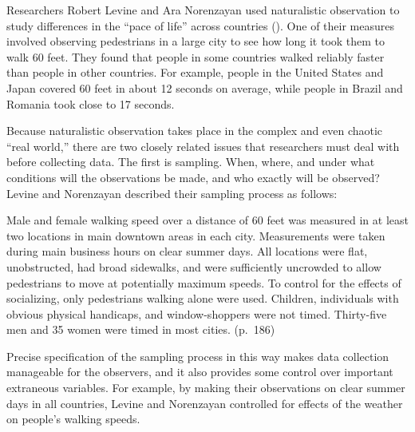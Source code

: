 \documentclass[
]{krantz}
\begin{document}
Researchers Robert Levine and Ara Norenzayan used naturalistic observation to study differences in the ``pace of life'' across countries (). One of their measures involved observing pedestrians in a large city to see how long it took them to walk 60 feet. They found that people in some countries walked reliably faster than people in other countries. For example, people in the United States and Japan covered 60 feet in about 12 seconds on average, while people in Brazil and Romania took close to 17 seconds.

Because naturalistic observation takes place in the complex and even chaotic ``real world,'' there are two closely related issues that researchers must deal with before collecting data. The first is sampling. When, where, and under what conditions will the observations be made, and who exactly will be observed? Levine and Norenzayan described their sampling process as follows:

Male and female walking speed over a distance of 60 feet was measured in at least two locations in main downtown areas in each city. Measurements were taken during main business hours on clear summer days. All locations were flat, unobstructed, had broad sidewalks, and were sufficiently uncrowded to allow pedestrians to move at potentially maximum speeds. To control for the effects of socializing, only pedestrians walking alone were used. Children, individuals with obvious physical handicaps, and window-shoppers were not timed. Thirty-five men and 35 women were timed in most cities. (p.~186)

Precise specification of the sampling process in this way makes data collection manageable for the observers, and it also provides some control over important extraneous variables. For example, by making their observations on clear summer days in all countries, Levine and Norenzayan controlled for effects of the weather on people's walking speeds.
\end{document}
